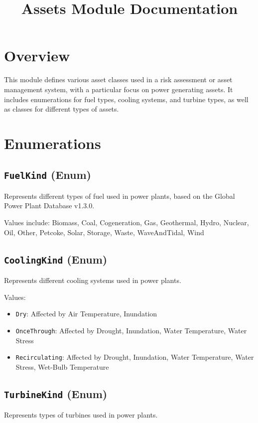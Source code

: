 \documentclass{article}
\title{Assets Module Documentation}
\author{}
\date{}
\begin{document}
\maketitle

\section{Overview}

This module defines various asset classes used in a risk assessment or asset management system, with a particular focus on power generating assets. It includes enumerations for fuel types, cooling systems, and turbine types, as well as classes for different types of assets.

\section{Enumerations}

\subsection{\texttt{FuelKind} (Enum)}
Represents different types of fuel used in power plants, based on the Global Power Plant Database v1.3.0.

Values include: Biomass, Coal, Cogeneration, Gas, Geothermal, Hydro, Nuclear, Oil, Other, Petcoke, Solar, Storage, Waste, WaveAndTidal, Wind

\subsection{\texttt{CoolingKind} (Enum)}
Represents different cooling systems used in power plants.

Values:
\begin{itemize}
    \item \texttt{Dry}: Affected by Air Temperature, Inundation
    \item \texttt{OnceThrough}: Affected by Drought, Inundation, Water Temperature, Water Stress
    \item \texttt{Recirculating}: Affected by Drought, Inundation, Water Temperature, Water Stress, Wet-Bulb Temperature
\end{itemize}

\subsection{\texttt{TurbineKind} (Enum)}
Represents types of turbines used in power plants.
\end{document}
